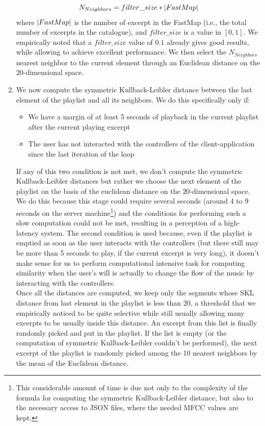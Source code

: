 \begin{enumerate}
\begin{equation}
N_{Neighbors} = filter\_size * \lvert FastMap\rvert
\end{equation} 
where $\lvert FastMap\rvert$ is the number of excerpt in the FastMap (i.e., the total number of excerpts in the catalogue), and $filter\_size$ is a value in $[0, 1]$. We empirically noted that a $filter\_size$ value of $0.1$ already gives good results, while allowing to achieve excellent performance. We then select the $N_{Neighbors}$ nearest neighbor to the current element through an Euclidean distance on the $20$-dimensional space. 
\item We now compute the symmetric Kullback-Leibler distance between the last element of the playlist and all its neighbors. We do this specifically only if:
\begin{itemize}
\item We have a margin of at least 5 seconds of playback in the current playlist after the current playing excerpt
\item The user has not interacted with the controllers of the client-application since the last iteration of the loop
\end{itemize}
If any of this two condition is not met, we don't compute the symmetric Kullback-Leibler distances but rather we choose the next element of the playlist on the basis of the euclidean distance on the $20$-dimensional space. We do this because this stage could require several seconds (around 4 to 9 seconds on the server machine\footnote{This considerable amount of time is due not only to the complexity of the formula for computing the symmetric Kullback-Leibler distance, but also to the necessary access to JSON files, where the needed MFCC values are kept.}) and the conditions for performing such a slow computation could not be met, resulting in a perception of a high-latency system. The second condition is used because, even if the playlist is emptied as soon as the user interacts with the controllers (but there still may be more than 5 seconds to play, if the current excerpt is very long), it doesn't make sense for us to perform computational intensive task for computing similarity when the user's will is actually to change the flow of the music by interacting with the controllers. \\ Once all the distances are computed, we keep only the segments whose SKL distance from last element in the playlist is less than 20, a threshold that we empirically noticed to be quite selective while still usually allowing many excerpts to be usually inside this distance. An excerpt from this list is finally randomly picked and put in the playlist. If the list is empty (or the computation of symmetric Kullback-Leibler couldn't be performed), the next excerpt of the playlist is randomly picked among the 10 nearest neighbors by the mean of the Euclidean distance. 
\end{enumerate}

